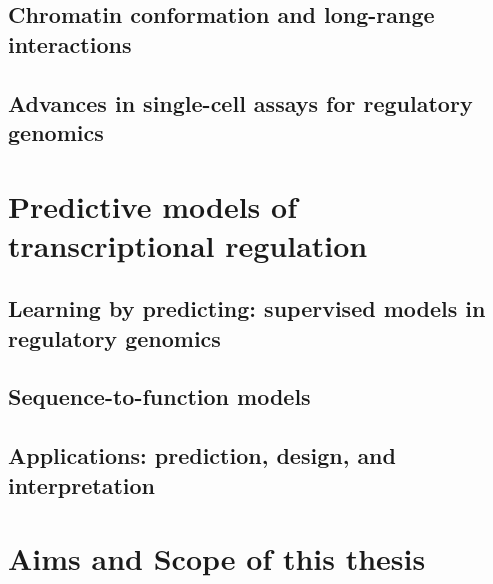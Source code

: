 \begin{dissertationintroduction}
\subsection{Chromatin conformation and long-range interactions}

\subsection{Advances in single-cell assays for regulatory genomics}

\section{Predictive models of transcriptional regulation}

\subsection{Learning by predicting: supervised models in regulatory genomics}

\subsection{Sequence-to-function models}

\subsection{Applications: prediction, design, and interpretation}

\section{Aims and Scope of this thesis}

\end{dissertationintroduction}
